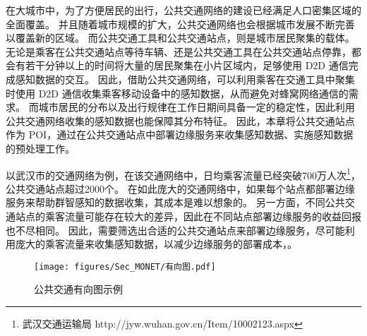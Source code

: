 在大城市中，为了方便居民的出行，公共交通网络的建设已经满足人口密集区域的全面覆盖。
并且随着城市规模的扩大，公共交通网络也会根据城市发展不断完善以覆盖新的区域。
而公共交通工具和公共交通站点，则是城市居民聚集的载体。
无论是乘客在公共交通站点等待车辆、还是公共交通工具在公共交通站点停靠，都会有若干分钟以上的时间将大量的居民聚集在小片区域内，足够使用 D2D 通信完成感知数据的交互。
因此，借助公共交通网络，可以利用乘客在交通工具中聚集时使用 D2D 通信收集乘客移动设备中的感知数据，从而避免对蜂窝网络通信的需求。
而城市居民的分布以及出行规律在工作日期间具备一定的稳定性，因此利用公共交通网络收集的感知数据也能保障其分布特征。
因此，本章将公共交通站点作为 POI，通过在公共交通站点中部署边缘服务来收集感知数据、实施感知数据的预处理工作。



以武汉市的交通网络为例，在该交通网络中，日均乘客流量已经突破700万人次\footnote{武汉交通运输局 http://jyw.wuhan.gov.cn/Item/10002123.aspx}，公共交通站点超过2000个。
在如此庞大的交通网络中，如果每个站点都部署边缘服务来帮助群智感知的数据收集，其成本是难以想象的。
另一方面，不同公共交通站点的乘客流量可能存在较大的差异，因此在不同站点部署边缘服务的收益回报也不尽相同。
因此，需要筛选出合适的公共交通站点来部署边缘服务，尽可能利用庞大的乘客流量来收集感知数据，以减少边缘服务的部署成本，。

\begin{figure}[!h]
  \centering
  \texttt{[image: figures/Sec\_MONET/有向图.pdf]}
  \vspace{-0.5em}
  \caption{公共交通有向图示例}
  \vspace{-1em}
  \label{Figure_Wuhan_Buses}
\end{figure}

